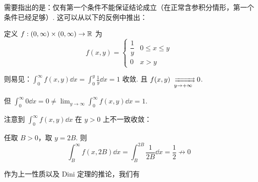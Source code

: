 \begin{hint}
    需要指出的是：仅有第一个条件不能保证结论成立（在正常含参积分情形，第一个条件已经足够）. 这可以从以下的反例中推出：
\end{hint}

\begin{example}
    定义 $f:(0,\infty)\times(0,\infty)\to\mathbb{R}$ 为
$$
f(x,y)=\begin{cases}
    \dfrac{1}{y} & 0\le x\le y\\
    0 & x>y
\end{cases}
$$

    \begin{center}
    \end{center}

    则易见：$\displaystyle\int_0^\infty f(x,y)\dd x=\int_0^y\frac{1}{y}\dd x=1$ 收敛. 且 $f(x,y)\xrightrightarrows[y\to+\infty]{}0$.

    但 $\displaystyle\int_0^\infty 0\dd x=0\ne\lim_{y\to\infty}\int_0^\infty f(x,y)\dd x=1$.

    注意到 $\displaystyle\int_0^\infty f(x,y)\dd x$ 在 $y>0$ 上不一致收敛：

    任取 $B>0$，取 $y=2B$. 则
$$
\int_B^\infty f(x,2B)\dd x=\int_B^{2B}\frac{1}{2B}\dd x=\frac{1}{2}\not\to 0
$$
\end{example}

作为上一性质以及 Dini 定理的推论，我们有

